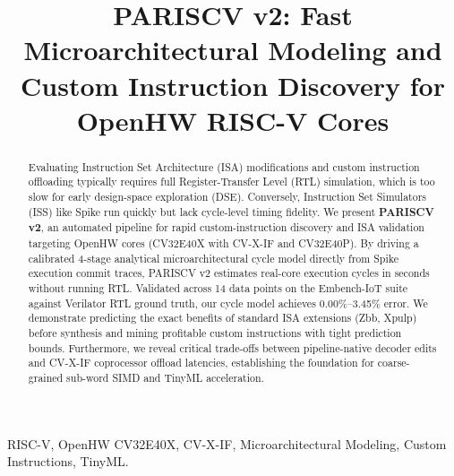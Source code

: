 \documentclass[conference]{IEEEtran}
\begin{document}
\title{PARISCV v2: Fast Microarchitectural Modeling and Custom Instruction Discovery for OpenHW RISC-V Cores}

\author{
}

\maketitle

\begin{abstract}
Evaluating Instruction Set Architecture (ISA) modifications and custom instruction offloading typically requires full Register-Transfer Level (RTL) simulation, which is too slow for early design-space exploration (DSE). Conversely, Instruction Set Simulators (ISS) like Spike run quickly but lack cycle-level timing fidelity. We present \textbf{PARISCV v2}, an automated pipeline for rapid custom-instruction discovery and ISA validation targeting OpenHW cores (CV32E40X with CV-X-IF and CV32E40P). By driving a calibrated 4-stage analytical microarchitectural cycle model directly from Spike execution commit traces, PARISCV v2 estimates real-core execution cycles in seconds without running RTL. Validated across 14 data points on the Embench-IoT suite against Verilator RTL ground truth, our cycle model achieves 0.00\%--3.45\% error. We demonstrate predicting the exact benefits of standard ISA extensions (Zbb, Xpulp) before synthesis and mining profitable custom instructions with tight prediction bounds. Furthermore, we reveal critical trade-offs between pipeline-native decoder edits and CV-X-IF coprocessor offload latencies, establishing the foundation for coarse-grained sub-word SIMD and TinyML acceleration.
\end{abstract}

\begin{IEEEkeywords}
RISC-V, OpenHW CV32E40X, CV-X-IF, Microarchitectural Modeling, Custom Instructions, TinyML.
\end{IEEEkeywords}
\end{document}
